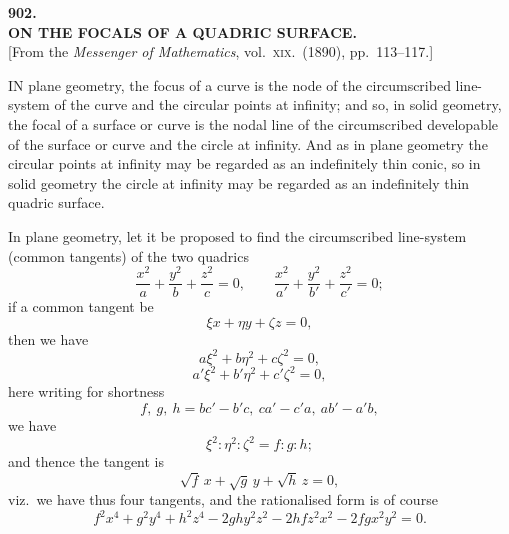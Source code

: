 \documentclass[11pt,a4paper]{article}
\begin{document}
\clearpage

\begin{center}
{\large\bfseries 902.}\\[0.5em]
{\large\bfseries ON THE FOCALS OF A QUADRIC SURFACE.}\\[0.5em]
\small [From the \emph{Messenger of Mathematics}, vol.\ \textsc{xix}.\ (1890), pp.\ 113--117.]
\end{center}
\medskip

\noindent IN plane geometry, the focus of a curve is the node of the circumscribed line-system of the curve and the circular points at infinity; and so, in solid geometry, the focal of a surface or curve is the nodal line of the circumscribed developable of the surface or curve and the circle at infinity. And as in plane geometry the circular points at infinity may be regarded as an indefinitely thin conic, so in solid geometry the circle at infinity may be regarded as an indefinitely thin quadric surface.

In plane geometry, let it be proposed to find the circumscribed line-system (common tangents) of the two quadrics
\[
\frac{x^2}{a} + \frac{y^2}{b} + \frac{z^2}{c} = 0,\qquad \frac{x^2}{a'} + \frac{y^2}{b'} + \frac{z^2}{c'} = 0;
\]
if a common tangent be
\[
\xi x + \eta y + \zeta z = 0,
\]
then we have
\[
a \xi^2 + b \eta^2 + c \zeta^2 = 0,
\]
\[
a' \xi^2 + b' \eta^2 + c' \zeta^2 = 0,
\]
here writing for shortness
\[
f,\ g,\ h = bc' - b'c,\ ca' - c'a,\ ab' - a'b,
\]
we have
\[
\xi^2 : \eta^2 : \zeta^2 = f : g : h;
\]
and thence the tangent is
\[
\sqrt{f}\,x + \sqrt{g}\,y + \sqrt{h}\,z = 0,
\]
viz.\ we have thus four tangents, and the rationalised form is of course
\[
f^2 x^4 + g^2 y^4 + h^2 z^4 - 2 g h y^2 z^2 - 2 h f z^2 x^2 - 2 f g x^2 y^2 = 0.
\]

\medskip
\end{document}
